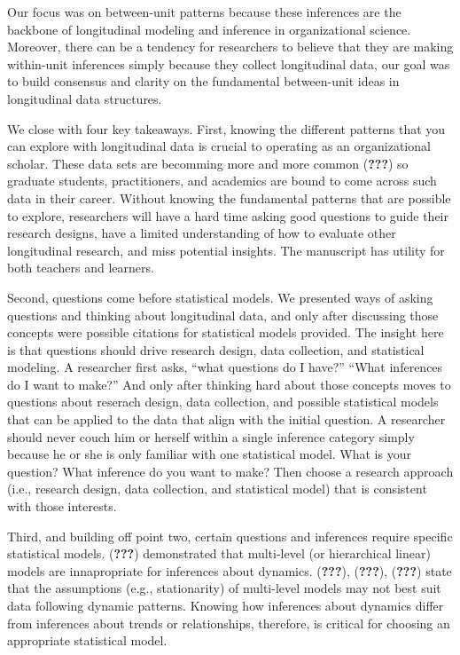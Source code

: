 \documentclass[english,,man]{apa6}
\begin{document}
Our focus was on between-unit patterns because these inferences are the backbone of longitudinal modeling and inference in organizational science. Moreover, there can be a tendency for researchers to believe that they are making within-unit inferences simply because they collect longitudinal data, our goal was to build consensus and clarity on the fundamental between-unit ideas in longitudinal data structures.

We close with four key takeaways. First, knowing the different patterns that you can explore with longitudinal data is crucial to operating as an organizational scholar. These data sets are becomming more and more common ({\textbf{???}}) so graduate students, practitioners, and academics are bound to come across such data in their career. Without knowing the fundamental patterns that are possible to explore, researchers will have a hard time asking good questions to guide their research designs, have a limited understanding of how to evaluate other longitudinal research, and miss potential insights. The manuscript has utility for both teachers and learners.

Second, questions come before statistical models. We presented ways of asking questions and thinking about longitudinal data, and only after discussing those concepts were possible citations for statistical models provided. The insight here is that questions should drive research design, data collection, and statistical modeling. A researcher first asks, \enquote{what questions do I have?} \enquote{What inferences do I want to make?} And only after thinking hard about those concepts moves to questions about reserach design, data collection, and possible statistical models that can be applied to the data that align with the initial question. A researcher should never couch him or herself within a single inference category simply because he or she is only familiar with one statistical model. What is your question? What inference do you want to make? Then choose a research approach (i.e., research design, data collection, and statistical model) that is consistent with those interests.

Third, and building off point two, certain questions and inferences require specific statistical models. ({\textbf{???}}) demonstrated that multi-level (or hierarchical linear) models are innapropriate for inferences about dynamics. ({\textbf{???}}), ({\textbf{???}}), ({\textbf{???}}) state that the assumptions (e.g., stationarity) of multi-level models may not best suit data following dynamic patterns. Knowing how inferences about dynamics differ from inferences about trends or relationships, therefore, is critical for choosing an appropriate statistical model.
\end{document}
